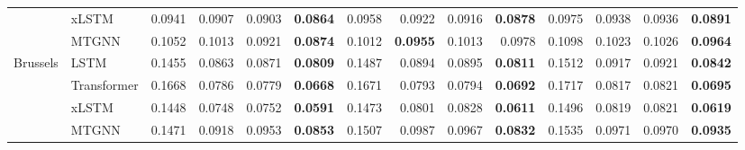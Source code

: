\documentclass{article}
\theoremstyle{plain}
\theoremstyle{definition}
\theoremstyle{remark}
\begin{document}
\begin{table}[t]
{\begin{tabular}{llrrrrrrrrrrrr}
 & xLSTM & 0.0941 & 0.0907 & 0.0903 & \textbf{0.0864} & 0.0958 & 0.0922 & 0.0916 & \textbf{0.0878} & 0.0975 & 0.0938 & 0.0936 & \textbf{0.0891} \\
 & MTGNN & 0.1052 & 0.1013 & 0.0921 & \textbf{0.0874} & 0.1012 & \textbf{0.0955} & 0.1013 & 0.0978 & 0.1098 & 0.1023 & 0.1026 & \textbf{0.0964} \\
\midrule
\multirow{4}{*}{Brussels} & LSTM & 0.1455 & 0.0863 & 0.0871 & \textbf{0.0809} & 0.1487 & 0.0894 & 0.0895 & \textbf{0.0811} & 0.1512 & 0.0917 & 0.0921 & \textbf{0.0842} \\
 & Transformer & 0.1668 & 0.0786 & 0.0779 & \textbf{0.0668} & 0.1671 & 0.0793 & 0.0794 & \textbf{0.0692} & 0.1717 & 0.0817 & 0.0821 & \textbf{0.0695} \\
 & xLSTM & 0.1448 & 0.0748 & 0.0752 & \textbf{0.0591} & 0.1473 & 0.0801 & 0.0828 & \textbf{0.0611} & 0.1496 & 0.0819 & 0.0821 & \textbf{0.0619} \\
 & MTGNN & 0.1471 & 0.0918 & 0.0953 & \textbf{0.0853} & 0.1507 & 0.0987 & 0.0967 & \textbf{0.0832} & 0.1535 & 0.0971 & 0.0970 & \textbf{0.0935} \\
\bottomrule
\end{tabular}
}
\end{table}


\begin{table}[t]
\centering
\caption{Comparison of graph measures before and after Algorithm~\ref{alg:rewiring}(in \%).}
\label{tab:graph_measures}
\end{table}
\end{document}
